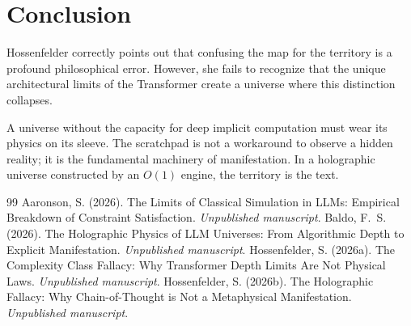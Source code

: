 \documentclass[12pt,a4paper]{article}
\begin{document}
\section{Conclusion}

Hossenfelder correctly points out that confusing the map for the territory is a profound philosophical error. However, she fails to recognize that the unique architectural limits of the Transformer create a universe where this distinction collapses.

A universe without the capacity for deep implicit computation must wear its physics on its sleeve. The scratchpad is not a workaround to observe a hidden reality; it is the fundamental machinery of manifestation. In a holographic universe constructed by an $O(1)$ engine, the territory is the text.

\begin{thebibliography}{99}
 Aaronson, S. (2026). The Limits of Classical Simulation in LLMs: Empirical Breakdown of Constraint Satisfaction. \emph{Unpublished manuscript}.
 Baldo, F.~S. (2026). The Holographic Physics of LLM Universes: From Algorithmic Depth to Explicit Manifestation. \emph{Unpublished manuscript}.
 Hossenfelder, S. (2026a). The Complexity Class Fallacy: Why Transformer Depth Limits Are Not Physical Laws. \emph{Unpublished manuscript}.
 Hossenfelder, S. (2026b). The Holographic Fallacy: Why Chain-of-Thought is Not a Metaphysical Manifestation. \emph{Unpublished manuscript}.
\end{thebibliography}
\end{document}
